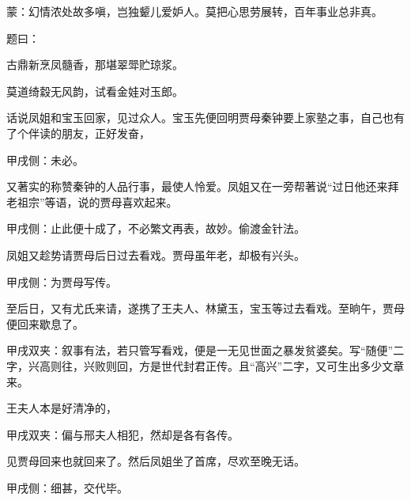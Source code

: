 
\begin{parag}
    \begin{note}蒙：幻情浓处故多嗔，岂独颦儿爱妒人。莫把心思劳展转，百年事业总非真。\end{note}
\end{parag}


\begin{parag}
    题曰：
\end{parag}


\begin{poem}
    \begin{pl}古鼎新烹凤髓香，那堪翠斝贮琼浆。\end{pl}

    \begin{pl}莫道绮縠无风韵，试看金娃对玉郎。\end{pl}
\end{poem}


\begin{parag}
    话说凤姐和宝玉回家，见过众人。宝玉先便回明贾母秦钟要上家塾之事，自己也有了个伴读的朋友，正好发奋，\begin{note}甲戌侧：未必。\end{note}又著实的称赞秦钟的人品行事，最使人怜爱。凤姐又在一旁帮著说“过日他还来拜老祖宗”等语，说的贾母喜欢起来。\begin{note}甲戌侧：止此便十成了，不必繁文再表，故妙。偷渡金针法。\end{note}凤姐又趁势请贾母后日过去看戏。贾母虽年老，却极有兴头。\begin{note}甲戌侧：为贾母写传。\end{note}至后日，又有尤氏来请，遂携了王夫人、林黛玉，宝玉等过去看戏。至晌午，贾母便回来歇息了。\begin{note}甲戌双夹：叙事有法，若只管写看戏，便是一无见世面之暴发贫婆矣。写“随便”二字，兴高则往，兴败则回，方是世代封君正传。且“高兴”二字，又可生出多少文章来。\end{note}王夫人本是好清净的，\begin{note}甲戌双夹：偏与邢夫人相犯，然却是各有各传。\end{note}见贾母回来也就回来了。然后凤姐坐了首席，尽欢至晚无话。\begin{note}甲戌侧：细甚，交代毕。\end{note}
\end{parag}


